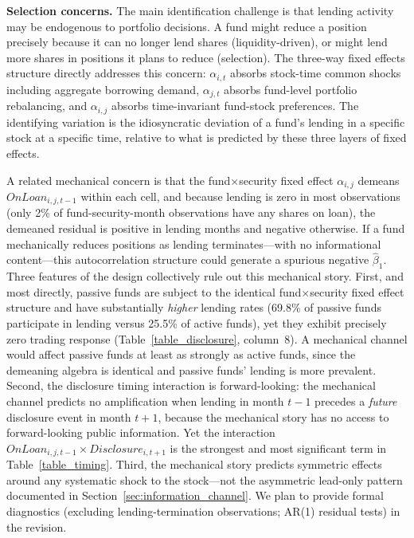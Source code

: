 \textbf{Selection concerns.} The main identification challenge is that lending activity may be endogenous to portfolio decisions. A fund might reduce a position precisely because it can no longer lend shares (liquidity-driven), or might lend more shares in positions it plans to reduce (selection). The three-way fixed effects structure directly addresses this concern: $\alpha_{i,t}$ absorbs stock-time common shocks including aggregate borrowing demand, $\alpha_{j,t}$ absorbs fund-level portfolio rebalancing, and $\alpha_{i,j}$ absorbs time-invariant fund-stock preferences. The identifying variation is the idiosyncratic deviation of a fund's lending in a specific stock at a specific time, relative to what is predicted by these three layers of fixed effects.

A related mechanical concern is that the fund$\times$security fixed effect $\alpha_{i,j}$ demeans $OnLoan_{i,j,t-1}$ within each cell, and because lending is zero in most observations (only 2\% of fund-security-month observations have any shares on loan), the demeaned residual is positive in lending months and negative otherwise. If a fund mechanically reduces positions as lending terminates---with no informational content---this autocorrelation structure could generate a spurious negative $\hat{\beta}_1$. Three features of the design collectively rule out this mechanical story. First, and most directly, passive funds are subject to the identical fund$\times$security fixed effect structure and have substantially \emph{higher} lending rates (69.8\% of passive funds participate in lending versus 25.5\% of active funds), yet they exhibit precisely zero trading response (Table~\ref{table_disclosure}, column~8). A mechanical channel would affect passive funds at least as strongly as active funds, since the demeaning algebra is identical and passive funds' lending is more prevalent. Second, the disclosure timing interaction is forward-looking: the mechanical channel predicts no amplification when lending in month $t-1$ precedes a \emph{future} disclosure event in month $t+1$, because the mechanical story has no access to forward-looking public information. Yet the interaction $OnLoan_{i,j,t-1} \times \mathit{Disclosure}_{i,t+1}$ is the strongest and most significant term in Table~\ref{table_timing}. Third, the mechanical story predicts symmetric effects around any systematic shock to the stock---not the asymmetric lead-only pattern documented in Section~\ref{sec:information_channel}. We plan to provide formal diagnostics (excluding lending-termination observations; AR(1) residual tests) in the revision.


